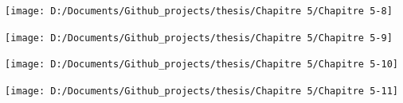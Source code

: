 \documentclass[
  english,
  man]{apa6}
\begin{document}
\begin{center}\texttt{[image: D:/Documents/Github\_projects/thesis/Chapitre 5/Chapitre 5-8]} \end{center}

\begin{center}\texttt{[image: D:/Documents/Github\_projects/thesis/Chapitre 5/Chapitre 5-9]} \end{center}

\begin{center}\texttt{[image: D:/Documents/Github\_projects/thesis/Chapitre 5/Chapitre 5-10]} \end{center}

\begin{center}\texttt{[image: D:/Documents/Github\_projects/thesis/Chapitre 5/Chapitre 5-11]} \end{center}
\end{document}
